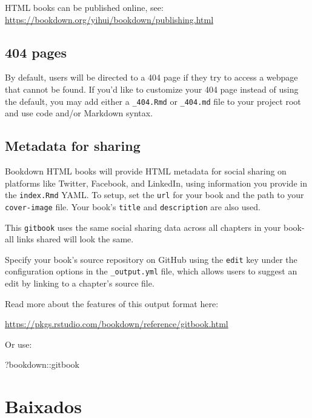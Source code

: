 \documentclass[
]{book}
\newenvironment{Shaded}{\begin{snugshade}}{\end{snugshade}}
\newcommand{\NormalTok}[1]{#1}
\newcommand{\SpecialCharTok}[1]{\textcolor[rgb]{0.00,0.00,0.00}{#1}}
\begin{document}
HTML books can be published online, see: \url{https://bookdown.org/yihui/bookdown/publishing.html}

\hypertarget{pages-2}{%
\section{404 pages}\label{pages-2}}

By default, users will be directed to a 404 page if they try to access a webpage that cannot be found. If you'd like to customize your 404 page instead of using the default, you may add either a \texttt{\_404.Rmd} or \texttt{\_404.md} file to your project root and use code and/or Markdown syntax.

\hypertarget{metadata-for-sharing-2}{%
\section{Metadata for sharing}\label{metadata-for-sharing-2}}

Bookdown HTML books will provide HTML metadata for social sharing on platforms like Twitter, Facebook, and LinkedIn, using information you provide in the \texttt{index.Rmd} YAML. To setup, set the \texttt{url} for your book and the path to your \texttt{cover-image} file. Your book's \texttt{title} and \texttt{description} are also used.

This \texttt{gitbook} uses the same social sharing data across all chapters in your book- all links shared will look the same.

Specify your book's source repository on GitHub using the \texttt{edit} key under the configuration options in the \texttt{\_output.yml} file, which allows users to suggest an edit by linking to a chapter's source file.

Read more about the features of this output format here:

\url{https://pkgs.rstudio.com/bookdown/reference/gitbook.html}

Or use:

\begin{Shaded}
\begin{Highlighting}[]
\NormalTok{?bookdown}\SpecialCharTok{::}\NormalTok{gitbook}
\end{Highlighting}
\end{Shaded}

\hypertarget{baixados}{%
\chapter{Baixados}\label{baixados}}
\end{document}
